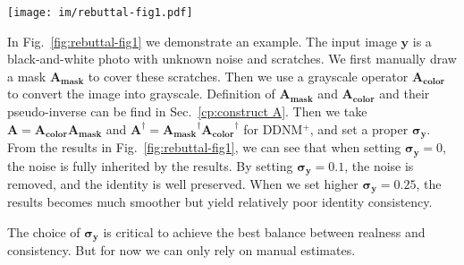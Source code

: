 \documentclass{article} \usepackage{iclr2023_conference,times}
\begin{document}
\begin{figure*}[ht]
  \centering
  \texttt{[image: im/rebuttal-fig1.pdf]}
  \vspace{-0.5cm}
  \caption{Old photo restoration. Zoom in for the best view. By setting $\mathbf{\sigma_{\mathbf{y}}}=0.1$, the noise is removed, and the identity is well preserved. When we set higher $\mathbf{\sigma_{\mathbf{y}}}=0.25$, the results becomes much smoother but yield relatively poor identity consistency.}
\label{fig:rebuttal-fig1} 
\end{figure*}

In Fig.~\ref{fig:rebuttal-fig1} we demonstrate an example. The input image $\mathbf{y}$ is a black-and-white photo with unknown noise and scratches. We first manually draw a mask $\mathbf{A_{mask}}$ to cover these scratches. Then we use a grayscale operator $\mathbf{A_{color}}$ to convert the image into grayscale. Definition of $\mathbf{A_{mask}}$ and $\mathbf{A_{color}}$ and their pseudo-inverse can be find in Sec.~\ref{cp:construct A}. Then we take $\mathbf{A}=\mathbf{A_{color}}\mathbf{A_{mask}}$ and $\mathbf{A}^{\dagger}=\mathbf{A_{mask}}^{\dagger}\mathbf{A_{color}}^{\dagger}$ for DDNM$^{+}$, and set a proper $\mathbf{\sigma_{\mathbf{y}}}$. From the results in Fig.~\ref{fig:rebuttal-fig1}, we can see that when setting $\mathbf{\sigma_{\mathbf{y}}}=0$, the noise is fully inherited by the results. By setting $\mathbf{\sigma_{\mathbf{y}}}=0.1$, the noise is removed, and the identity is well preserved. When we set higher $\mathbf{\sigma_{\mathbf{y}}}=0.25$, the results becomes much smoother but yield relatively poor identity consistency. 

The choice of $\mathbf{\sigma_{\mathbf{y}}}$ is critical to achieve the best balance between realness and consistency. But for now we can only rely on manual estimates.


\newpage


\end{document}
